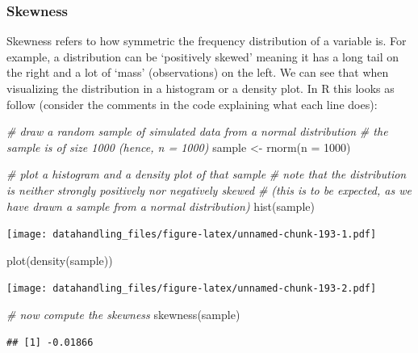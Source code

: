 \documentclass[
  12pt,
]{style/krantz}
\newenvironment{Shaded}{\begin{snugshade}}{\end{snugshade}}
\newcommand{\AttributeTok}[1]{\textcolor[rgb]{0.77,0.63,0.00}{#1}}
\newcommand{\CommentTok}[1]{\textcolor[rgb]{0.56,0.35,0.01}{\textit{#1}}}
\newcommand{\DecValTok}[1]{\textcolor[rgb]{0.00,0.00,0.81}{#1}}
\newcommand{\FunctionTok}[1]{\textcolor[rgb]{0.00,0.00,0.00}{#1}}
\newcommand{\NormalTok}[1]{#1}
\newcommand{\OtherTok}[1]{\textcolor[rgb]{0.56,0.35,0.01}{#1}}
\begin{document}
\hypertarget{skewness}{%
\subsubsection{Skewness}\label{skewness}}

Skewness refers to how symmetric the frequency distribution of a variable is. For example, a distribution can be `positively skewed' meaning it has a long tail on the right and a lot of `mass' (observations) on the left. We can see that when visualizing the distribution in a histogram or a density plot. In R this looks as follow (consider the comments in the code explaining what each line does):

\begin{Shaded}
\begin{Highlighting}[]
\CommentTok{\# draw a random sample of simulated data from a normal distribution}
\CommentTok{\# the sample is of size 1000 (hence, n = 1000)}
\NormalTok{sample }\OtherTok{\textless{}{-}} \FunctionTok{rnorm}\NormalTok{(}\AttributeTok{n =} \DecValTok{1000}\NormalTok{)}

\CommentTok{\# plot a histogram and a density plot of that sample}
\CommentTok{\# note that the distribution is neither strongly positively nor negatively skewed}
\CommentTok{\# (this is to be expected, as we have drawn a sample from a normal distribution)}
\FunctionTok{hist}\NormalTok{(sample)}
\end{Highlighting}
\end{Shaded}

\texttt{[image: datahandling\_files/figure-latex/unnamed-chunk-193-1.pdf]}

\begin{Shaded}
\begin{Highlighting}[]
\FunctionTok{plot}\NormalTok{(}\FunctionTok{density}\NormalTok{(sample))}
\end{Highlighting}
\end{Shaded}

\texttt{[image: datahandling\_files/figure-latex/unnamed-chunk-193-2.pdf]}

\begin{Shaded}
\begin{Highlighting}[]
\CommentTok{\# now compute the skewness}
\FunctionTok{skewness}\NormalTok{(sample)}
\end{Highlighting}
\end{Shaded}

\begin{verbatim}
## [1] -0.01866
\end{verbatim}
\end{document}
